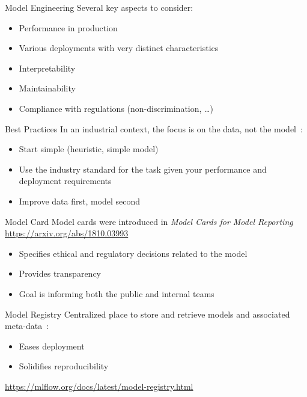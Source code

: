 
\begin{frame}{Model Engineering}
  Several key aspects to consider:

  \begin{itemize}
  \item Performance in production
  \item Various deployments with very distinct characteristics
  \item Interpretability
  \item Maintainability
  \item Compliance with regulations (non-discrimination, \dots)
  \end{itemize}

  \hugo
\end{frame}


\begin{frame}{Best Practices}
  In an industrial context, the focus is on the data, not the model~:

  \begin{itemize}
    \item Start simple (heuristic, simple model)
    \item Use the industry standard for the task given your performance and deployment requirements
    \item Improve data first, model second
  \end{itemize}

  \hugo
\end{frame}


\begin{frame}{Model Card}
  Model cards were introduced in \textit{Model Cards for Model Reporting}\\
   \url{https://arxiv.org/abs/1810.03993}

  \begin{itemize}
    \item Specifies ethical and regulatory decisions related to the model
    \item Provides transparency
    \item Goal is informing both the public and internal teams
  \end{itemize}

  \hugo
\end{frame}


\begin{frame}{Model Registry}
  Centralized place to store and retrieve models and associated meta-data~:

  \begin{itemize}
    \item Eases deployment
    \item Solidifies reproducibility
  \end{itemize}

  \url{https://mlflow.org/docs/latest/model-registry.html}

  \hugo
\end{frame}




